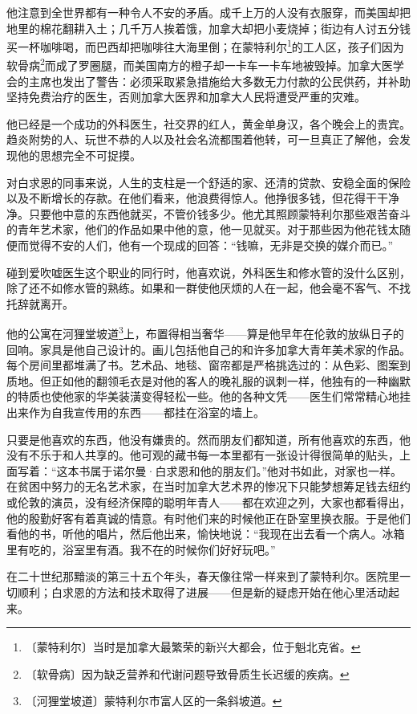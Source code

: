 \documentclass[12pt,UTF-8,openany]{ctexbook}
\begin{document}
\begin{large}
    他注意到全世界都有一种令人不安的矛盾。成千上万的人没有衣服穿，而美国却把地里的棉花翻耕入土；几千万人挨着饿，加拿大却把小麦烧掉；街边有人讨五分钱买一杯咖啡喝，而巴西却把咖啡往大海里倒；在蒙特利尔\footnote{〔蒙特利尔〕当时是加拿大最繁荣的新兴大都会，位于魁北克省。}的工人区，孩子们因为软骨病\footnote{〔软骨病〕因为缺乏营养和代谢问题导致骨质生长迟缓的疾病。}而成了罗圈腿，而美国南方的橙子却一卡车一卡车地被毁掉。加拿大医学会的主席也发出了警告：必须采取紧急措施给大多数无力付款的公民供药，并补助坚持免费治疗的医生，否则加拿大医界和加拿大人民将遭受严重的灾难。
    
    他已经是一个成功的外科医生，社交界的红人，黄金单身汉，各个晚会上的贵宾。趋炎附势的人、玩世不恭的人以及社会名流都围着他转，可一旦真正了解他，会发现他的思想完全不可捉摸。
    
    对白求恩的同事来说，人生的支柱是一个舒适的家、还清的贷款、安稳全面的保险以及不断增长的存款。在他们看来，他浪费得惊人。他挣很多钱，但花得干干净净。只要他中意的东西他就买，不管价钱多少。他尤其照顾蒙特利尔那些艰苦奋斗的青年艺术家，他们的作品如果中他的意，他一见就买。对于那些因为他花钱太随便而觉得不安的人们，他有一个现成的回答：“钱嘛，无非是交换的媒介而已。”
    
    碰到爱吹嘘医生这个职业的同行时，他喜欢说，外科医生和修水管的没什么区别，除了还不如修水管的熟练。如果和一群使他厌烦的人在一起，他会毫不客气、不找托辞就离开。
    
    他的公寓在河狸堂坡道\footnote{〔河狸堂坡道〕蒙特利尔市富人区的一条斜坡道。}上，布置得相当奢华——算是他早年在伦敦的放纵日子的回响。家具是他自己设计的。画儿包括他自己的和许多加拿大青年美术家的作品。每个房间里都堆满了书。艺术品、地毯、窗帘都是严格挑选过的：从色彩、图案到质地。但正如他的翻领毛衣是对他的客人的晚礼服的讽刺一样，他独有的一种幽默的特质也使他家的华美装潢变得轻松一些。他的各种文凭——医生们常常精心地挂出来作为自我宣传用的东西——都挂在浴室的墙上。
    
    只要是他喜欢的东西，他没有嫌贵的。然而朋友们都知道，所有他喜欢的东西，他没有不乐于和人共享的。他可观的藏书每一本里都有一张设计得很简单的贴头，上面写着：“这本书属于诺尔曼·白求恩和他的朋友们。”他对书如此，对家也一样。在贫困中努力的无名艺术家，在当时加拿大艺术界的惨况下只能梦想筹足钱去纽约或伦敦的演员，没有经济保障的聪明年青人——都在欢迎之列，大家也都看得出，他的殷勤好客有着真诚的情意。有时他们来的时候他正在卧室里换衣服。于是他们看他的书，听他的唱片，然后他出来，愉快地说：“我现在出去看一个病人。冰箱里有吃的，浴室里有酒。我不在的时候你们好好玩吧。”
    
    在二十世纪那黯淡的第三十五个年头，春天像往常一样来到了蒙特利尔。医院里一切顺利；白求恩的方法和技术取得了进展——但是新的疑虑开始在他心里活动起来。
    

\end{large}
\end{document}

